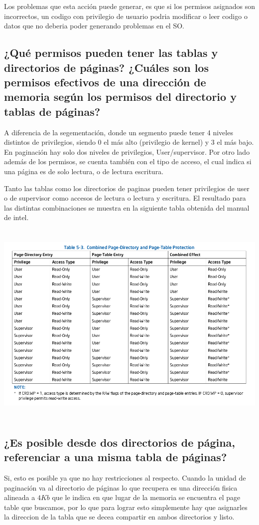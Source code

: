 \documentclass[a4paper,10pt,twoside]{article}
\begin{document}
Los problemas que esta acción puede generar, es que si los permisos asignados son incorrectos, un codigo con privilegio de usuario podria modificar o leer codigo o datos que no deberia poder generando problemas en el SO.

\subsection{¿Qué permisos pueden tener las tablas y directorios de páginas? ¿Cuáles
son los permisos efectivos de una dirección de memoria según los permisos del directorio
y tablas de páginas?}
A diferencia de la segementación, donde un segmento puede tener 4 niveles distintos de privilegios, siendo 0 el más alto (privilegio de kernel) y 3 el más bajo. En paginación hay solo dos niveles de privilegios, User/supervisor. Por otro lado además de los permisos, se cuenta también con el tipo de acceso, el cual indica si una página es de solo lectura, o de lectura escritura.

Tanto las tablas como los directorios de paginas pueden tener privilegios de user o de supervisor como accesos de lectura o lectura y escritura. El resultado para las distintas combinaciones se muestra en la siguiente tabla obtenida del manual de intel.

\includegraphics[height=10cm]{privilegios.png} 

\subsection{¿Es posible desde dos directorios de página, referenciar a una misma tabla de páginas?}
Si, esto es posible ya que no hay restricciones al respecto. Cuando la unidad de paginación va al directorio de páginas lo que recupera es una dirección fisica alineada a $4Kb$ que le indica en que lugar de la memoria se encuentra el page table que buscamos, por lo que para lograr esto simplemente hay que asignarles la direccion de la tabla que se decea compartir en ambos directorios y listo.
\end{document}
